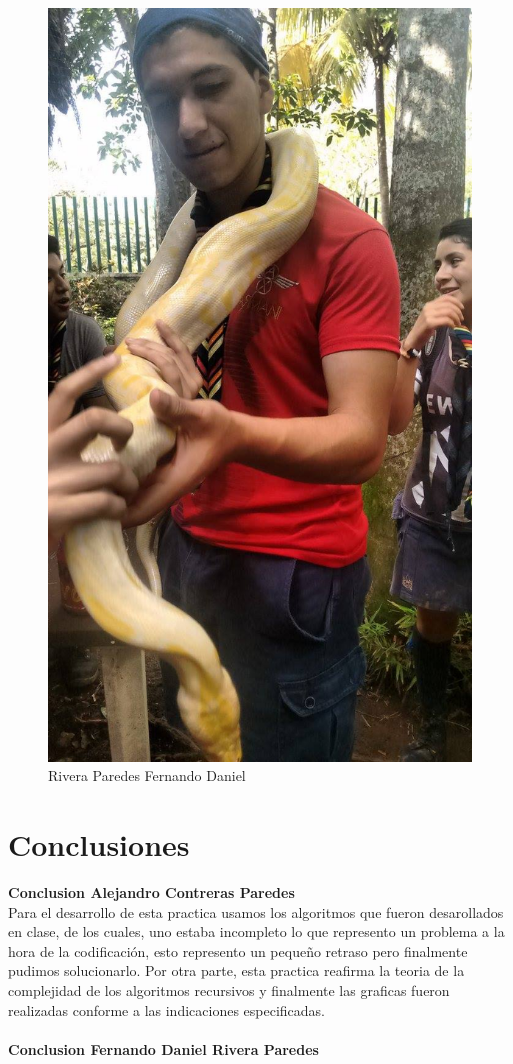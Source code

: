 \documentclass[12pt,twoside]{article}
\begin{document}
\begin{figure}[!h]
\begin{minipage}[t]{10cm}
		\includegraphics[scale=0.2]{Foto2}
		\caption{Rivera Paredes Fernando Daniel}
	\end{minipage}
\end{figure}
\newpage
\section{Conclusiones}
\textbf{Conclusion Alejandro Contreras Paredes}\\
Para el desarrollo de esta practica usamos los algoritmos que fueron desarollados en clase, de los cuales, uno estaba incompleto
lo que represento un problema a la hora de la codificación, esto represento un pequeño retraso pero finalmente pudimos solucionarlo. Por otra
parte, esta practica reafirma la teoria de la complejidad de los algoritmos recursivos y finalmente las graficas fueron realizadas conforme a las indicaciones
especificadas.\\\\
\textbf{Conclusion Fernando Daniel Rivera Paredes}\\
\end{document}

